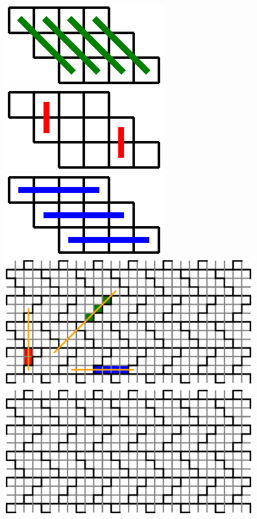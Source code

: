 \documentclass{article}
\begin{document}
\\
\includegraphics{8-rules1.eps}
\includegraphics{8-rules2.eps}
\includegraphics{8-rules3.eps}
\\
\includegraphics{8-sol.eps}
\\
\includegraphics{8-sol-initial.eps}
\end{document}
